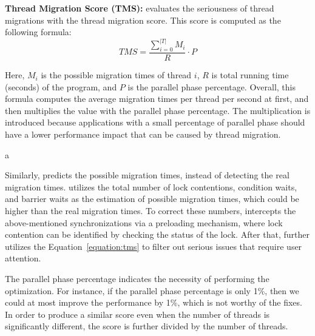 \textbf{Thread Migration Score (TMS):} \NP{} evaluates the seriousness of thread migrations with the thread migration score. This score is computed as the following formula: 
\begin{equation}
TMS =  \dfrac{\sum_{i=0}^{|T|} {M_i}}{R} \cdot P \label{equation:tms}
\end{equation}


Here,  $M_i$ is the possible migration times of  thread $i$, $R$ is total running time (seconds) of the program, and $P$ is the parallel phase percentage. Overall, this formula computes the average migration times per thread per second at first, and then multiplies the value with the parallel phase percentage. The multiplication is introduced because applications with a small percentage of parallel phase should have a lower performance impact that can be caused by thread migration. 

a%

Similarly, \NP{} predicts the possible migration times, instead of detecting the real migration times. \NP{} utilizes the total number of lock contentions, condition waits, and barrier waits as the estimation of possible migration times, which could be higher than the real migration times. To correct these numbers, \NP{} intercepts the above-mentioned synchronizations via a preloading mechanism, where lock contention can be identified by checking the status of the lock. After that, \NP{} further utilizes the Equation~\ref{equation:tms} to filter out serious issues that require user attention. 

The parallel phase percentage indicates the necessity of performing the optimization. For instance, if the parallel phase percentage is only 1\%, then we could at most improve the performance by 1\%, which is not worthy of the fixes.   In order to produce a similar score even when the number of threads is significantly different, the score is further divided by the number of threads. 

